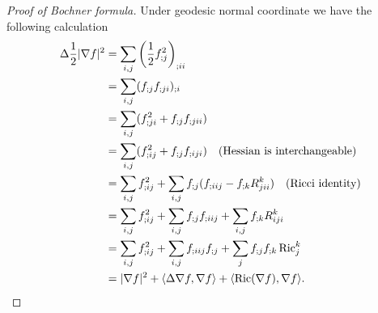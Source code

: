 \begin{proof}[Proof of Bochner formula]
    Under geodesic normal coordinate we have the following calculation
    \begin{align*}
        \Delta\frac{1}{2}|\nabla f|^2&=\sum_{i,j}\left(\frac{1}{2}f^2_{;j}\right)_{;ii}\\
        &=\sum_{i,j}(f_{;j}f_{;ji})_{;i}\\
        &=\sum_{i,j}(f^2_{;ji}+f_{;j}f_{;jii})\\
        &=\sum_{i,j}(f^2_{;ij}+f_{;j}f_{;iji})\quad\text{(Hessian is interchangeable)}\\
        &=\sum_{i,j}f^2_{;ij}+\sum_{i,j}f_{;j}(f_{;iij}-f_{;k}R_{jii}^k)\quad\text{(Ricci identity)}\\
        &=\sum_{i,j}f^2_{;ij}+\sum_{i,j}f_{;j}f_{;iij}+\sum_{i,j}f_{;k}R_{iji}^k\\
        &=\sum_{i,j}f^2_{;ij}+\sum_{i,j}f_{;iij}f_{;j}+\sum_{j}f_{;j}f_{;k}\operatorname{Ric}_j^k\\
        &=|\nabla f|^2+\langle\Delta\nabla f,\nabla f\rangle+\langle\operatorname{Ric}(\nabla f),\nabla f\rangle.\qedhere
    \end{align*}
\end{proof}

